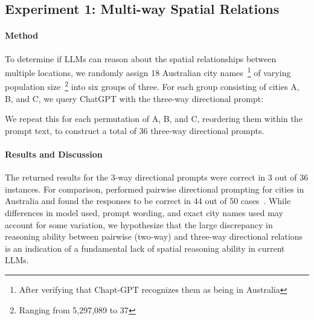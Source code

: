 



\subsection{Experiment 1: Multi-way Spatial Relations}
\paragraph{Method}
To determine if LLMs can reason about the spatial relationships between multiple locations, we randomly assign 18 Australian city names~\footnote{After verifying that Chapt-GPT recognizes them as being in Australia} of varying population size~\footnote{Ranging from 5,297,089 to 37} into six groups of three.
For each group consisting of cities A, B, and C, we query ChatGPT with the three-way directional prompt: 
\begin{center}
\end{center}

We repeat this for each permutation of A, B, and C, reordering them within the prompt text, to construct a total of 36 three-way directional prompts.

\paragraph{Results and Discussion}
The returned results for the 3-way directional prompts were correct in 3 out of 36 instances.
For comparison, \citeauthor{Qi2023} performed pairwise directional prompting for cities in Australia and found the responses to be correct in 44 out of 50 cases~\cite{Qi2023}.
While differences in model used, prompt wording, and exact city names used may account for some variation, we hypothesize that the large discrepancy in reasoning ability between pairwise (two-way) and three-way directional relations is an indication of a fundamental lack of spatial reasoning ability in current LLMs.

